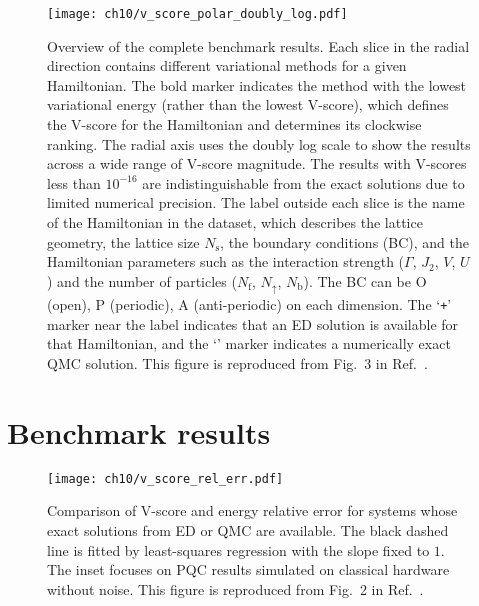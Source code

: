 \begin{figure}[!h]
\centering
\hspace*{-0.05\linewidth}
\texttt{[image: ch10/v\_score\_polar\_doubly\_log.pdf]}
\caption[Overview of VarBench results]{
Overview of the complete benchmark results.
Each slice in the radial direction contains different variational methods for a given Hamiltonian. The bold marker indicates the method with the lowest variational energy (rather than the lowest V-score), which defines the V-score for the Hamiltonian and determines its clockwise ranking.
The radial axis uses the doubly log scale to show the results across a wide range of V-score magnitude.
The results with V-scores less than $10^{-16}$ are indistinguishable from the exact solutions due to limited numerical precision.
The label outside each slice is the name of the Hamiltonian in the dataset, which describes the lattice geometry, the lattice size $N_\text{s}$, the boundary conditions (BC), and the Hamiltonian parameters such as the interaction strength ($\Gamma$, $J_2$, $V$, $U$) and the number of particles ($N_\mathrm{f}$, $N_{\uparrow}$, $N_\mathrm{b}$).
The BC can be O (open), P (periodic), A (anti-periodic) on each dimension.
The `\texttt{+}' marker near the label indicates that an ED solution is available for that Hamiltonian, and the `\texttt{\textasteriskcentered}' marker indicates a numerically exact QMC solution.
This figure is reproduced from Fig.~3 in Ref.~\cite{wu2023variational}.
}
\label{fig:v-score}
\end{figure}

\newpage

\section{Benchmark results}

\begin{figure}[htb]
\centering
\texttt{[image: ch10/v\_score\_rel\_err.pdf]}
\caption[Comparison of V-score and energy relative error]{
Comparison of V-score and energy relative error for systems whose exact solutions from ED or QMC are available.
The black dashed line is fitted by least-squares regression with the slope fixed to $1$.
The inset focuses on PQC results simulated on classical hardware without noise.
This figure is reproduced from Fig.~2 in Ref.~\cite{wu2023variational}.
}
\label{fig:v-score-rel-err}
\end{figure}

